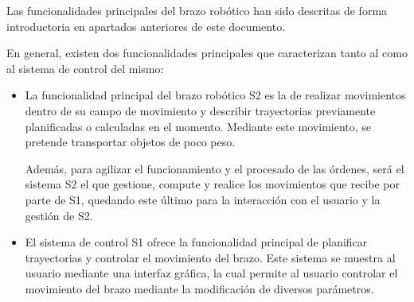 Las funcionalidades principales del brazo robótico han sido descritas de forma introductoria en apartados anteriores de este documento.

En general, existen dos funcionalidades principales que caracterizan tanto al \pArm{} como al sistema de control del mismo:
\begin{itemize}
    \item La funcionalidad principal del brazo robótico \ac{S2} es la de realizar movimientos dentro de su campo de movimiento y describir trayectorias previamente planificadas o calculadas en el momento. Mediante este movimiento, se pretende transportar objetos de poco peso.
    
    Además, para agilizar el funcionamiento y el procesado de las órdenes, será el sistema \ac{S2} el que gestione, compute y realice los movimientos que recibe por parte de \ac{S1}, quedando este último para la interacción con el usuario y la gestión de \ac{S2}.
    
    \item El sistema de control \ac{S1} ofrece la funcionalidad principal de planificar trayectorias y controlar el movimiento del brazo. Este sistema se muestra al usuario mediante una interfaz gráfica, la  cual permite al usuario controlar el movimiento del brazo mediante la modificación de diversos parámetros.
\end{itemize}
